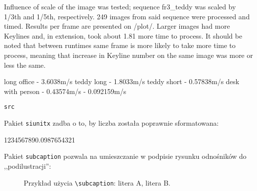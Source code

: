 


Influence of scale of the image was tested; sequence fr3\_teddy was scaled by 1/3th and 1/5th, respectively. 249 images from said sequence were processed and timed. Results per frame are presented on /plot/. Larger images had more Keylines and, in extension, took about 1.81 more time to process. It should be noted that between runtimes same frame is more likely to take more time to process, meaning that increase in Keyline number on the same image was more or less the same.


long office - 3.6038m/s
teddy long - 1.8033m/s
teddy short - 0.57838m/s
desk with person - 0.43574m/s
				 - 0.092159m/s







\begin{lstlisting}
src
\end{lstlisting}

Pakiet \texttt{siunitx} zadba o to, by liczba została poprawnie sformatowana: \\
\begin{center}
	\num{1234567890.0987654321}
\end{center}


Pakiet \texttt{subcaption} pozwala na umieszczanie w podpisie rysunku odnośników do ,,podilustracji'': \\

\begin{figure}[h]
	\centering
	\begin{subfigure}{0.35\textwidth}
		\centering
		\subcaption{\label{subfigure_a}}
	\end{subfigure}
	\begin{subfigure}{0.35\textwidth}
		\centering
		\subcaption{\label{subfigure_b}}
	\end{subfigure}
	
	\caption{\label{fig:subcaption_example}Przykład użycia \texttt{\textbackslash subcaption}: \protect{} litera A, \protect{} litera B.}
\end{figure}

